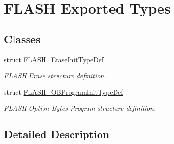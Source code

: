 \hypertarget{group___f_l_a_s_h_ex___exported___types}{}\section{F\+L\+A\+SH Exported Types}
\label{group___f_l_a_s_h_ex___exported___types}
\subsection*{Classes}
\begin{DoxyCompactItemize}
\item 
struct \mbox{\hyperlink{struct_f_l_a_s_h___erase_init_type_def}{F\+L\+A\+S\+H\+\_\+\+Erase\+Init\+Type\+Def}}
\begin{DoxyCompactList}\small\item\em F\+L\+A\+SH Erase structure definition. \end{DoxyCompactList}\item 
struct \mbox{\hyperlink{struct_f_l_a_s_h___o_b_program_init_type_def}{F\+L\+A\+S\+H\+\_\+\+O\+B\+Program\+Init\+Type\+Def}}
\begin{DoxyCompactList}\small\item\em F\+L\+A\+SH Option Bytes Program structure definition. \end{DoxyCompactList}\end{DoxyCompactItemize}


\subsection{Detailed Description}
